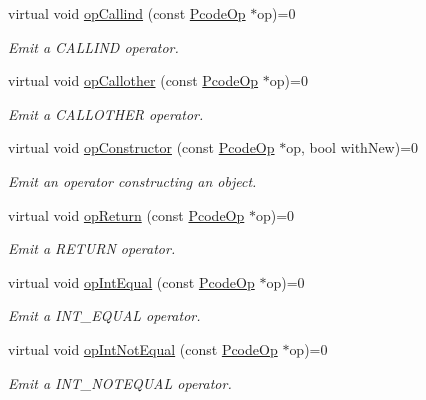\begin{DoxyCompactItemize}
virtual void \mbox{\hyperlink{class_print_language_a8b91670d8a37457a07ed8319df8c1ac1}{op\+Callind}} (const \mbox{\hyperlink{class_pcode_op}{Pcode\+Op}} $\ast$op)=0
\begin{DoxyCompactList}\small\item\em Emit a C\+A\+L\+L\+I\+ND operator. \end{DoxyCompactList}\item 
virtual void \mbox{\hyperlink{class_print_language_ab7d4d8c977097d8fe7fd24e303c48270}{op\+Callother}} (const \mbox{\hyperlink{class_pcode_op}{Pcode\+Op}} $\ast$op)=0
\begin{DoxyCompactList}\small\item\em Emit a C\+A\+L\+L\+O\+T\+H\+ER operator. \end{DoxyCompactList}\item 
virtual void \mbox{\hyperlink{class_print_language_a22939be1cb4a9b4e53121092b7be26b6}{op\+Constructor}} (const \mbox{\hyperlink{class_pcode_op}{Pcode\+Op}} $\ast$op, bool with\+New)=0
\begin{DoxyCompactList}\small\item\em Emit an operator constructing an object. \end{DoxyCompactList}\item 
virtual void \mbox{\hyperlink{class_print_language_a4e33d6fcb515f8cee76f11f95b114fa7}{op\+Return}} (const \mbox{\hyperlink{class_pcode_op}{Pcode\+Op}} $\ast$op)=0
\begin{DoxyCompactList}\small\item\em Emit a R\+E\+T\+U\+RN operator. \end{DoxyCompactList}\item 
virtual void \mbox{\hyperlink{class_print_language_a0cf69e63256fafc5572d32b02f901726}{op\+Int\+Equal}} (const \mbox{\hyperlink{class_pcode_op}{Pcode\+Op}} $\ast$op)=0
\begin{DoxyCompactList}\small\item\em Emit a I\+N\+T\+\_\+\+E\+Q\+U\+AL operator. \end{DoxyCompactList}\item 
virtual void \mbox{\hyperlink{class_print_language_a3800049255780c9456a1fe6cd347b24a}{op\+Int\+Not\+Equal}} (const \mbox{\hyperlink{class_pcode_op}{Pcode\+Op}} $\ast$op)=0
\begin{DoxyCompactList}\small\item\em Emit a I\+N\+T\+\_\+\+N\+O\+T\+E\+Q\+U\+AL operator. \end{DoxyCompactList}\item 

\end{DoxyCompactItemize}
